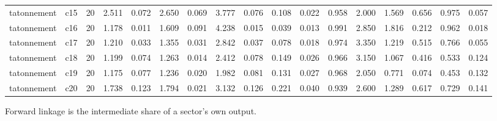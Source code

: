 \begin{table}[htbp]
\begin{tabular}{lrrrrrrrrrrrrrrrr}
tatonnement & c15 & 20 & 2.511 & 0.072 & 2.650 & 0.069 & 3.777 & 0.076 & 0.108 & 0.022 & 0.958 & 2.000 & 1.569 & 0.656 & 0.975 & 0.057 \\
tatonnement & c16 & 20 & 1.178 & 0.011 & 1.609 & 0.091 & 4.238 & 0.015 & 0.039 & 0.013 & 0.991 & 2.850 & 1.816 & 0.212 & 0.962 & 0.018 \\
tatonnement & c17 & 20 & 1.210 & 0.033 & 1.355 & 0.031 & 2.842 & 0.037 & 0.078 & 0.018 & 0.974 & 3.350 & 1.219 & 0.515 & 0.766 & 0.055 \\
tatonnement & c18 & 20 & 1.199 & 0.074 & 1.263 & 0.014 & 2.412 & 0.078 & 0.149 & 0.026 & 0.966 & 3.150 & 1.067 & 0.416 & 0.533 & 0.124 \\
tatonnement & c19 & 20 & 1.175 & 0.077 & 1.236 & 0.020 & 1.982 & 0.081 & 0.131 & 0.027 & 0.968 & 2.050 & 0.771 & 0.074 & 0.453 & 0.132 \\
tatonnement & c20 & 20 & 1.738 & 0.123 & 1.794 & 0.021 & 3.132 & 0.126 & 0.221 & 0.040 & 0.939 & 2.600 & 1.289 & 0.617 & 0.729 & 0.141 \\
\bottomrule
\end{tabular}
\par\smallskip
\begin{minipage}{\linewidth}\footnotesize Forward linkage is the intermediate share of a sector's own output.\end{minipage}
\end{table}
